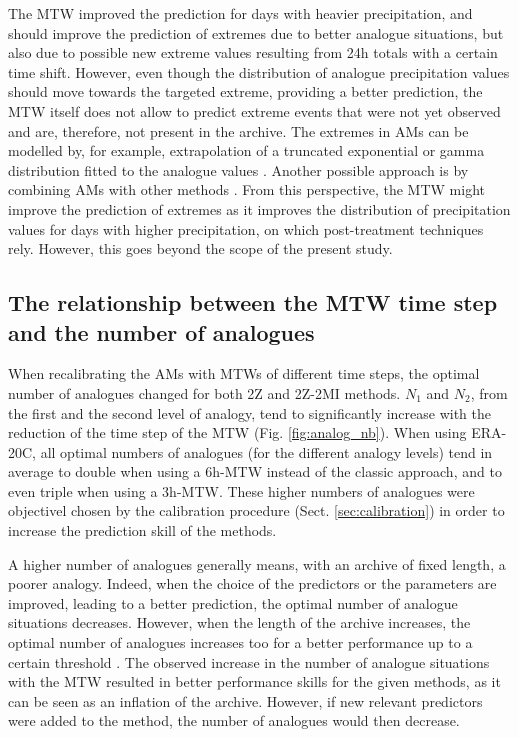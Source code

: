 \documentclass[hess, manuscript]{copernicus}
\begin{document}
	The MTW improved the prediction for days with heavier precipitation, and should improve the prediction of extremes due to better analogue situations, but also due to possible new extreme values resulting from 24h totals with a certain time shift. However, even though the distribution of analogue precipitation values should move towards the targeted extreme, providing a better prediction, the MTW itself does not allow to predict extreme events that were not yet observed and are, therefore, not present in the archive. The extremes in AMs can be modelled by, for example, extrapolation of a truncated exponential or gamma distribution fitted to the analogue values \citep{Obled2002}. Another possible approach is by combining AMs with other methods \citep[e.g.][]{Chardon2014}. From this perspective, the MTW might improve the prediction of extremes as it improves the distribution of precipitation values for days with higher precipitation, on which post-treatment techniques rely. However, this goes beyond the scope of the present study.
	
	
	\subsection{The relationship between the MTW time step and the number of analogues}
	\label{sec:increase_analognb}
	
	When recalibrating the AMs with MTWs of different time steps, the optimal number of analogues changed for both 2Z and 2Z-2MI methods. $N_{1}$ and $N_{2}$, from the first and the second level of analogy, tend to significantly increase with the reduction of the time step of the MTW (Fig. \ref{fig:analog_nb}). When using ERA-20C, all optimal numbers of analogues (for the different analogy levels) tend in average to double when using a 6h-MTW instead of the classic approach, and to even triple when using a 3h-MTW. These higher numbers of analogues were objectivel chosen by the calibration procedure (Sect. \ref{sec:calibration}) in order to increase the prediction skill of the methods.
	
	A higher number of analogues generally means, with an archive of fixed length, a poorer analogy. Indeed, when the choice of the predictors or the parameters are improved, leading to a better prediction, the optimal number of analogue situations decreases. However, when the length of the archive increases, the optimal number of analogues increases too for a better performance up to a certain threshold \citep[][]{Bontron2004, Hamill2006a}. The observed increase in the number of analogue situations with the MTW resulted in better performance skills for the given methods, as it can be seen as an inflation of the archive. However, if new relevant predictors were added to the method, the number of analogues would then decrease.
	
\end{document}
